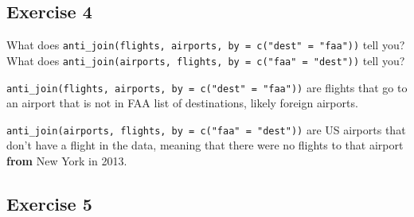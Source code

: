 \documentclass[]{book}
\newenvironment{Shaded}{\begin{snugshade}}{\end{snugshade}}
\newcommand{\CommentTok}[1]{\textcolor[rgb]{0.56,0.35,0.01}{\textit{#1}}}
\newcommand{\DataTypeTok}[1]{\textcolor[rgb]{0.13,0.29,0.53}{#1}}
\newcommand{\DecValTok}[1]{\textcolor[rgb]{0.00,0.00,0.81}{#1}}
\newcommand{\KeywordTok}[1]{\textcolor[rgb]{0.13,0.29,0.53}{\textbf{#1}}}
\newcommand{\NormalTok}[1]{#1}
\newcommand{\OperatorTok}[1]{\textcolor[rgb]{0.81,0.36,0.00}{\textbf{#1}}}
\newcommand{\OtherTok}[1]{\textcolor[rgb]{0.56,0.35,0.01}{#1}}
\newcommand{\StringTok}[1]{\textcolor[rgb]{0.31,0.60,0.02}{#1}}
\theoremstyle{definition}
\theoremstyle{definition}
\theoremstyle{definition}
\theoremstyle{remark}
\begin{document}
\begin{Shaded}
\end{Shaded}

\hypertarget{exercise-4-17}{%
\subsection{Exercise 4}\label{exercise-4-17}}

What does
\texttt{anti\_join(flights,\ airports,\ by\ =\ c("dest"\ =\ "faa"))}
tell you? What does
\texttt{anti\_join(airports,\ flights,\ by\ =\ c("faa"\ =\ "dest"))}
tell you?

\texttt{anti\_join(flights,\ airports,\ by\ =\ c("dest"\ =\ "faa"))} are
flights that go to an airport that is not in FAA list of destinations,
likely foreign airports.

\texttt{anti\_join(airports,\ flights,\ by\ =\ c("faa"\ =\ "dest"))} are
US airports that don't have a flight in the data, meaning that there
were no flights to that airport \textbf{from} New York in 2013.

\hypertarget{exercise-5-8}{%
\subsection{Exercise 5}\label{exercise-5-8}}
\end{document}
